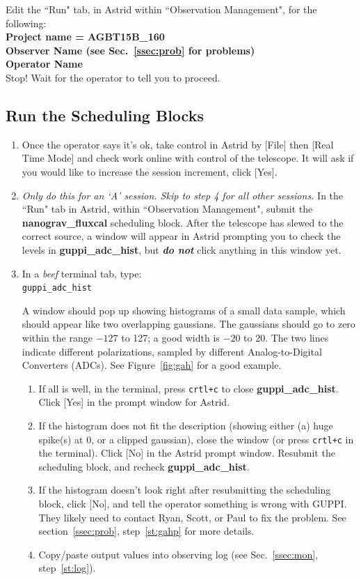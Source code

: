 \documentclass[11pt, reqno, tbtags]{article}
\begin{document}
\noindent Edit the ``Run" tab, in Astrid within ``Observation Management", for the following: \\
\indent\textbf{Project name = AGBT15B\_160 \\
\indent Observer Name (see Sec.~\ref{ssec:prob} for problems)\\
\indent Operator Name} \\
Stop! Wait for the operator to tell you to proceed.

\subsection{Run the Scheduling Blocks}\label{ssec:sched}  %
\begin{enumerate}
 \item Once the operator says it's ok, take control in Astrid by [File] then [Real Time Mode] and check work online with control of the telescope. It will ask if you would like to increase the session increment, click [Yes].
 \item \textit{Only do this for an `A' session. Skip to step 4 for all other sessions.}   In the ``Run" tab in Astrid, within ``Observation Management", submit the \textbf{nanograv\_fluxcal} scheduling block.  After the telescope has slewed to the correct source, a window will appear in Astrid prompting you to check the levels in \textbf{guppi\_adc\_hist}, but \textbf{\textit{do not}} click anything in this window yet.
 \item \label{st:adc} In a \textit{beef} terminal tab, type: \\
 \texttt{guppi\_adc\_hist}

 A window should pop up showing histograms of a small data sample, which should appear like two overlapping gaussians. The gaussians should go to zero within the range $-127$ to 127; a good width is $-20$ to 20. The two lines indicate different polarizations, sampled by different Analog-to-Digital Converters (ADCs).  See Figure~\ref{fig:gah} for a good example.

 \begin{enumerate}
  \item If all is well, in the terminal, press \texttt{crtl+c} to close \textbf{guppi\_adc\_hist}.  Click [Yes] in the prompt window for Astrid.  
  \item If the histogram does not fit the description (showing either (a) huge spike(s) at 0, or a clipped gaussian), close the window (or press \texttt{crtl+c} in the terminal).  Click [No] in the Astrid prompt window.  Resubmit the scheduling block, and recheck \textbf{guppi\_adc\_hist}. 
  \item If the histogram doesn't look right after resubmitting the scheduling block, click [No], and tell the operator something is wrong with GUPPI.  They likely need to contact Ryan, Scott, or Paul to fix the problem.  See section~\ref{ssec:prob}, step~\ref{st:gahp} for more details.
  \item Copy/paste output values into observing log (see Sec.~\ref{ssec:mon}, step~\ref{st:log}).  
 \end{enumerate}


\end{enumerate}
\end{document}
